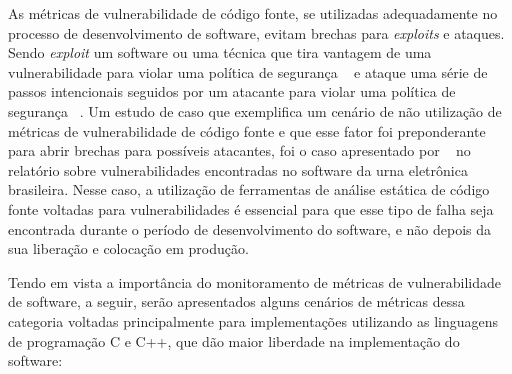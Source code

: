 As métricas de vulnerabilidade de código fonte, se utilizadas adequadamente no processo de desenvolvimento de software, evitam
brechas para \textit{exploits} e ataques. Sendo \textit{exploit} um software ou uma técnica que tira vantagem de uma 
vulnerabilidade para violar uma política de segurança ~\cite{seacord&householder2005} e ataque uma série de passos intencionais 
seguidos por um atacante para violar uma política de segurança ~\cite{howard&longstaff98}. Um estudo de caso que exemplifica 
um cenário de não utilização de métricas de vulnerabilidade de código fonte e que esse fator foi preponderante para abrir
brechas para possíveis atacantes, foi o caso apresentado por ~\cite{aranha2012} no relatório sobre vulnerabilidades 
encontradas no software da urna eletrônica brasileira. Nesse caso, a utilização de ferramentas de análise estática de código
fonte voltadas para vulnerabilidades é essencial para que esse tipo de falha seja encontrada durante o período de 
desenvolvimento do software, e não depois da sua liberação e colocação em produção.

Tendo em vista a importância do monitoramento de métricas de vulnerabilidade de software, a seguir, serão apresentados alguns
cenários de métricas dessa categoria voltadas principalmente para implementações utilizando as linguagens de programação C e 
C++, que dão maior liberdade na implementação do software:

